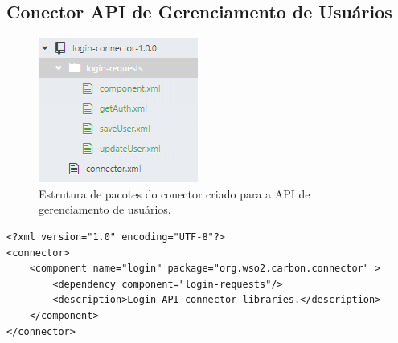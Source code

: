 \begin{apendicesenv}

\partapendices

\chapter{Conector API de Gerenciamento de Usuários}

\begin{figure}[!hbt]
\centering
\includegraphics[scale=1]{figuras/estrutura_conector_login.png}
\caption{Estrutura de pacotes do conector criado para a API de gerenciamento de usuários.}
\end{figure}



\begin{lstlisting}[caption={Conteúdo do arquivo "connector.xml".}]
<?xml version="1.0" encoding="UTF-8"?>
<connector>
    <component name="login" package="org.wso2.carbon.connector" >
		<dependency component="login-requests"/>
        <description>Login API connector libraries.</description>
    </component>
</connector>
\end{lstlisting}




\end{apendicesenv}
